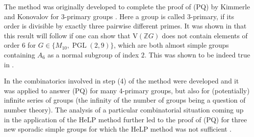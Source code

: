 \documentclass[10pt,a4paper,reqno]{amsart}
\theoremstyle{definition}
\theoremstyle{remark}
\newcommand{\V}{\mathrm{V}}
\newcommand{\ZZ}{\mathbb{Z}}
\begin{document}
The method was originally developed to complete the proof of (PQ) by Kimmerle and Konovalov for $3$-primary groups \cite{KK16}. Here a group is called $3$-primary, if its order is divisible by exactly three pairwise different primes. It was shown in \cite{KK16} that this result will follow if one can show that $\V(\ZZ G)$ does not contain elements of order $6$ for $G \in \{M_{10}, \operatorname{PGL}(2,9) \}$, which are both almost simple groups containing $A_6$ as a normal subgroup of index $2$. This was shown to be indeed true in \cite[Theorem 1.2]{BM17}.

In \cite{4primaryII} the combinatorics involved in step (4) of the method were developed and it was applied to answer (PQ) for many 4-primary groups, but also for (potentially) infinite series of groups (the infinity of the number of groups being a question of number theory). The analysis of a particular combinatorial situation coming up in the application of the HeLP method further led to the proof of (PQ) for three new sporadic simple groups for which the HeLP method was not sufficient \cite{Mar19}. 
\end{document}
